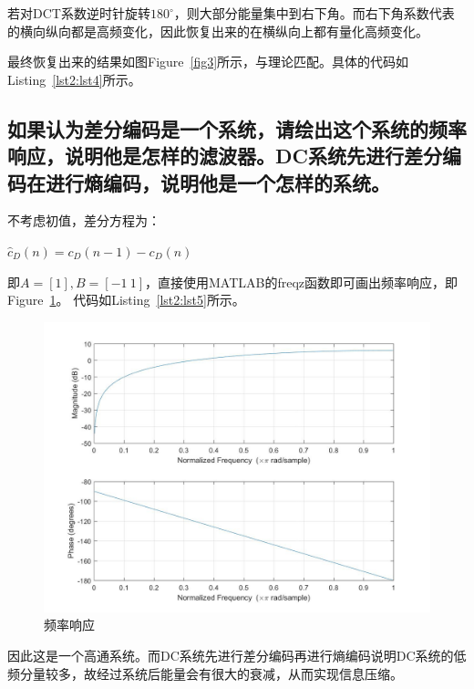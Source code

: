 \documentclass[a4paper]{article}
\begin{document}
	若对DCT系数逆时针旋转$180^\circ$，则大部分能量集中到右下角。而右下角系数代表的横向纵向都是高频变化，因此恢复出来的在横纵向上都有量化高频变化。
	
	最终恢复出来的结果如图Figure~\ref{fig3}所示，与理论匹配。具体的代码如Listing~\ref{lst2:lst4}所示。
	
	
	
	\subsection{如果认为差分编码是一个系统，请绘出这个系统的频率响应，说明他是怎样的滤波器。DC系统先进行差分编码在进行熵编码，说明他是一个怎样的系统。}
	
	不考虑初值，差分方程为：
	\begin{center}
		$ \hat{c}_{D}(n) = c_{D}(n-1) - c_{D}(n) $
	\end{center}
	
	即$ A = [1], B = [-1\ 1] $，直接使用MATLAB的freqz函数即可画出频率响应，即Figure~\ref{fig4}。
	代码如Listing~\ref{lst2:lst5}所示。
	
	\begin{figure}[H]
		\centering
		\includegraphics[width = .65\textwidth]{../source/3.2/frequency_plot.jpg}
		\caption{频率响应}
		\label{fig4}
	\end{figure}
	
	
	
	
	因此这是一个高通系统。而DC系统先进行差分编码再进行熵编码说明DC系统的低频分量较多，故经过系统后能量会有很大的衰减，从而实现信息压缩。
	
\end{document}

